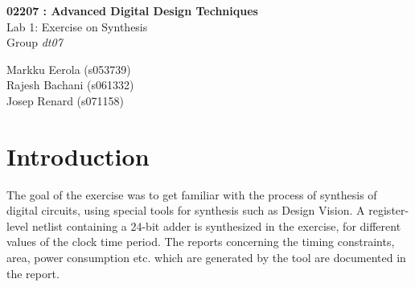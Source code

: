 \documentclass[11pt,a4paper]{article}
\begin{document}
	

\begin{titlepage}

\thispagestyle{fancy}
\lhead{}
\rhead{}
\rule{0pt}{50pt}
\vspace{3cm}

\begin{center}

 	\huge{\textbf{02207 : Advanced Digital Design Techniques}}\\
 	\vspace{1cm}
 	\huge{Lab 1: Exercise on Synthesis}\\
 	\vspace{1cm}
 	\huge{Group \textit{dt07}}\\
\end{center}

\vspace{4cm}

\begin{flushright}
	\LARGE{Markku Eerola (s053739)}\\
	\vspace{0.3cm}
	\LARGE{Rajesh Bachani (s061332)}\\
	\vspace{0.3cm}
	\LARGE{Josep Renard (s071158)}\\
\end{flushright}
\cfoot{\today}
\end{titlepage}


\newpage 
\tableofcontents

\newpage 
\section{Introduction}

The goal of the exercise was to get familiar with the process of synthesis of digital circuits, using special tools for synthesis such as Design Vision. A register-level netlist containing a 24-bit adder is synthesized in the exercise, for different values of the clock time period. The reports concerning the timing constraints, area, power consumption etc. which are generated by the tool are documented in the report.
\end{document}
